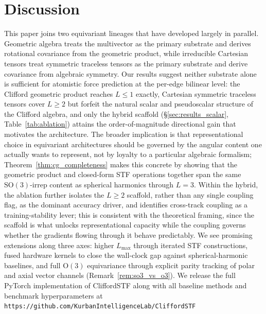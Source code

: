 \section{Discussion}\label{sec:discussion}

This paper joins two equivariant lineages that have developed largely in parallel. Geometric algebra treats the multivector as the primary substrate and derives rotational covariance from the geometric product, while irreducible Cartesian tensors treat symmetric traceless tensors as the primary substrate and derive covariance from algebraic symmetry. Our results suggest neither substrate alone is sufficient for atomistic force prediction at the per-edge bilinear level: the Clifford geometric product reaches $L \leq 1$ exactly, Cartesian symmetric traceless tensors cover $L \geq 2$ but forfeit the natural scalar and pseudoscalar structure of the Clifford algebra, and only the hybrid scaffold (\S\ref{sec:results_scalar}, Table~\ref{tab:ablation}) attains the order-of-magnitude directional gain that motivates the architecture. The broader implication is that representational choice in equivariant architectures should be governed by the angular content one actually wants to represent, not by loyalty to a particular algebraic formalism; Theorem~\ref{thm:cg_completeness} makes this concrete by showing that the geometric product and closed-form STF operations together span the same $\mathrm{SO}(3)$-irrep content as spherical harmonics through $L{=}3$. Within the hybrid, the ablation further isolates the $L \geq 2$ scaffold, rather than any single coupling flag, as the dominant accuracy driver, and identifies cross-track coupling as a training-stability lever; this is consistent with the theoretical framing, since the scaffold is what unlocks representational capacity while the coupling governs whether the gradients flowing through it behave predictably. We see promising extensions along three axes: higher $L_{\max}$ through iterated STF constructions, fused hardware kernels to close the wall-clock gap against spherical-harmonic baselines, and full $\mathrm{O}(3)$ equivariance through explicit parity tracking of polar and axial vector channels (Remark~\ref{rem:so3_vs_o3}). We release the full PyTorch implementation of CliffordSTF along with all baseline methods and benchmark hyperparameters at \texttt{https://github.com/KurbanIntelligenceLab/CliffordSTF}
